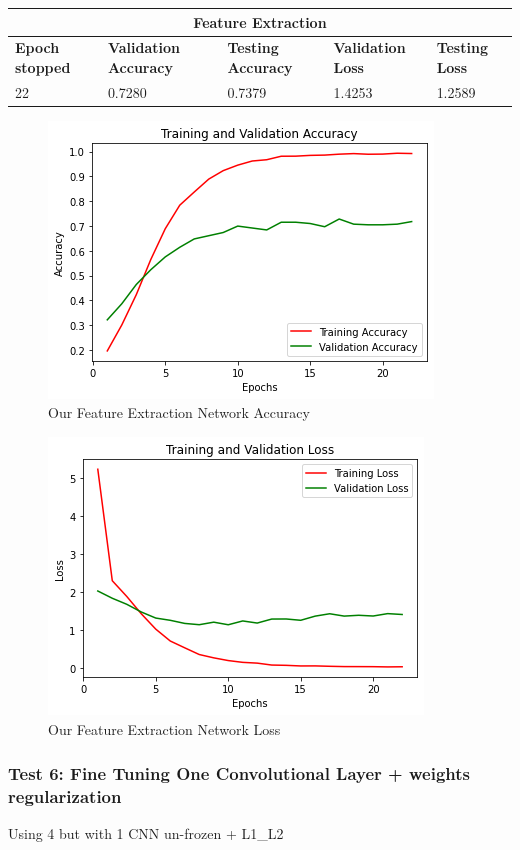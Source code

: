  \medskip

\begin{tabular}{ |p{2cm}|p{2cm}|p{2cm}|p{2cm}|p{2cm}|  }
\hline
\multicolumn{5}{|c|}{Feature Extraction} \\
\hline
\textbf{Epoch stopped} & \textbf{Validation Accuracy} & \textbf{Testing Accuracy} & \textbf{Validation Loss} & \textbf{Testing Loss} \\
\hline
22 & 0.7280 & 0.7379 & 1.4253 & 1.2589\\
\hline
\end{tabular}

\medskip

\begin{figure}[H]
	\centering
	\includegraphics[height=0.45\textwidth]{img/vgg16/vgg16ft2dropacc.png}
	\caption{Our Feature Extraction Network Accuracy}
	\label{fig:vgg16ft2dropacc}
\end{figure}

\begin{figure}[H]
	\centering
	\includegraphics[height=0.45\textwidth]{img/vgg16/vgg16ft2droploss.png}
	\caption{Our Feature Extraction Network Loss}
	\label{fig:vgg16ft2droploss}
\end{figure}








\subsubsection{Test 6: Fine Tuning One Convolutional Layer + weights regularization}
Using 4 but with 1 CNN un-frozen + L1\_L2



